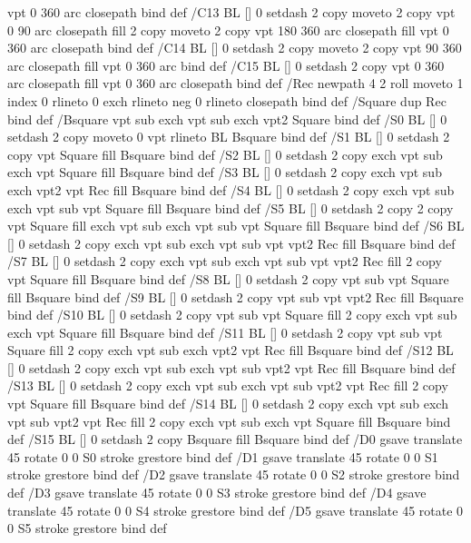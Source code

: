 {{               vpt 0 360 arc closepath } bind def
/C13 { BL [] 0 setdash  2 copy moveto
       2 copy  vpt 0 90 arc closepath fill
       2 copy moveto
       2 copy  vpt 180 360 arc closepath fill
               vpt 0 360 arc closepath } bind def
/C14 { BL [] 0 setdash 2 copy moveto
       2 copy  vpt 90 360 arc closepath fill
               vpt 0 360 arc } bind def
/C15 { BL [] 0 setdash 2 copy vpt 0 360 arc closepath fill
               vpt 0 360 arc closepath } bind def
/Rec   { newpath 4 2 roll moveto 1 index 0 rlineto 0 exch rlineto
       neg 0 rlineto closepath } bind def
/Square { dup Rec } bind def
/Bsquare { vpt sub exch vpt sub exch vpt2 Square } bind def
/S0 { BL [] 0 setdash 2 copy moveto 0 vpt rlineto BL Bsquare } bind def
/S1 { BL [] 0 setdash 2 copy vpt Square fill Bsquare } bind def
/S2 { BL [] 0 setdash 2 copy exch vpt sub exch vpt Square fill Bsquare } bind def
/S3 { BL [] 0 setdash 2 copy exch vpt sub exch vpt2 vpt Rec fill Bsquare } bind def
/S4 { BL [] 0 setdash 2 copy exch vpt sub exch vpt sub vpt Square fill Bsquare } bind def
/S5 { BL [] 0 setdash 2 copy 2 copy vpt Square fill
       exch vpt sub exch vpt sub vpt Square fill Bsquare } bind def
/S6 { BL [] 0 setdash 2 copy exch vpt sub exch vpt sub vpt vpt2 Rec fill Bsquare } bind def
/S7 { BL [] 0 setdash 2 copy exch vpt sub exch vpt sub vpt vpt2 Rec fill
       2 copy vpt Square fill
       Bsquare } bind def
/S8 { BL [] 0 setdash 2 copy vpt sub vpt Square fill Bsquare } bind def
/S9 { BL [] 0 setdash 2 copy vpt sub vpt vpt2 Rec fill Bsquare } bind def
/S10 { BL [] 0 setdash 2 copy vpt sub vpt Square fill 2 copy exch vpt sub exch vpt Square fill
       Bsquare } bind def
/S11 { BL [] 0 setdash 2 copy vpt sub vpt Square fill 2 copy exch vpt sub exch vpt2 vpt Rec fill
       Bsquare } bind def
/S12 { BL [] 0 setdash 2 copy exch vpt sub exch vpt sub vpt2 vpt Rec fill Bsquare } bind def
/S13 { BL [] 0 setdash 2 copy exch vpt sub exch vpt sub vpt2 vpt Rec fill
       2 copy vpt Square fill Bsquare } bind def
/S14 { BL [] 0 setdash 2 copy exch vpt sub exch vpt sub vpt2 vpt Rec fill
       2 copy exch vpt sub exch vpt Square fill Bsquare } bind def
/S15 { BL [] 0 setdash 2 copy Bsquare fill Bsquare } bind def
/D0 { gsave translate 45 rotate 0 0 S0 stroke grestore } bind def
/D1 { gsave translate 45 rotate 0 0 S1 stroke grestore } bind def
/D2 { gsave translate 45 rotate 0 0 S2 stroke grestore } bind def
/D3 { gsave translate 45 rotate 0 0 S3 stroke grestore } bind def
/D4 { gsave translate 45 rotate 0 0 S4 stroke grestore } bind def
/D5 { gsave translate 45 rotate 0 0 S5 stroke grestore } bind def
}
